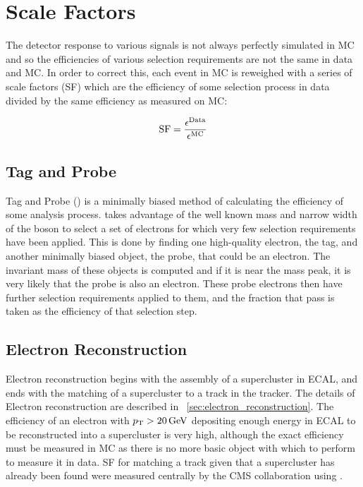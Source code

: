 \section{Scale Factors}
\label{sec:scale_factors}

The detector response to various signals is not always perfectly simulated in
MC and so the efficiencies of various selection requirements are not the same
in data and MC. In order to correct this, each event in MC is reweighed with a
series of scale factors (SF) which are the efficiency of some selection process
in data divided by the same efficiency as measured on MC:

\begin{equation}
    \label{eq:sf}
    \text{SF} = \frac{\epsilon^{\text{Data}}}{\epsilon^{\text{MC}}}
\end{equation}

\subsection{Tag and Probe}

Tag and Probe (\TnP) is a minimally biased method of calculating the efficiency
of some analysis process. \TnP takes advantage of the well known mass and
narrow width of the \Z boson to select a set of electrons for which very few
selection requirements have been applied. This is done by finding one
high-quality electron, the tag, and another minimally biased object, the probe,
that could be an electron. The invariant mass of these objects is computed and
if it is near the \Z mass peak, it is very likely that the probe is also an
electron. These probe electrons then have further selection requirements
applied to them, and the fraction that pass is taken as the efficiency of that
selection step.

\subsection{Electron Reconstruction}
\label{ssec:sf_reconstruction}

Electron reconstruction begins with the assembly of a supercluster in ECAL, and
ends with the matching of a supercluster to a track in the tracker. The details
of Electron reconstruction are described in
\SEC~\ref{sec:electron_reconstruction}. The efficiency of an electron with $p_{\mathrm{T}}
> 20 \,\text{Ge\hspace{-.08em}V}$ depositing enough energy in ECAL to be reconstructed into a
supercluster is very high, although the exact efficiency must be measured in
MC as there is no more basic object with which to perform \TnP to measure it in
data. SF for matching a track given that a supercluster has already been found
were measured centrally by the CMS collaboration using \TnP
\cite{gsf_scale_factors_2013}.

